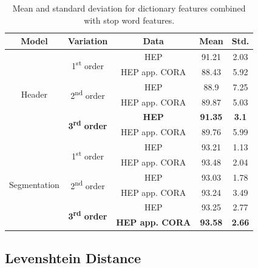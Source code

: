 \begin{table}[h]
\begin{center}
\begin{tabular}{|c|c|c|c|c|}
\hline
Model & Variation & Data & Mean & Std.\\
\hline \multirow{6}{*}{Header} & \multirow{2}{*}{1\textsuperscript{st} order} & HEP & 91.21 & 2.03\\\cline{3-5}
& & HEP app. CORA & 88.43 & 5.92\\\cline{2-5}
& \multirow{2}{*}{2\textsuperscript{nd} order} & HEP & 88.9 & 7.25\\\cline{3-5}
& & HEP app. CORA & 89.87 & 5.03\\\cline{2-5}
& \multirow{2}{*}{\textbf{3\textsuperscript{rd} order}} & \textbf{HEP} & \textbf{91.35} & \textbf{3.1}\\\cline{3-5}
& & HEP app. CORA & 89.76 & 5.99\\ \hline
\multirow{6}{*}{Segmentation} & \multirow{2}{*}{1\textsuperscript{st} order} & HEP & 93.21 & 1.13\\\cline{3-5}
& & HEP app. CORA & 93.48 & 2.04\\\cline{2-5}
& \multirow{2}{*}{2\textsuperscript{nd} order} & HEP & 93.03 & 1.78\\\cline{3-5}
& & HEP app. CORA & 93.24 & 3.49\\\cline{2-5}
& \multirow{2}{*}{\textbf{3\textsuperscript{rd} order}} & HEP & 93.25 & 2.77\\\cline{3-5}
& & \textbf{HEP app. CORA} & \textbf{93.58} & \textbf{2.66}\\
\hline
\end{tabular}
\caption{Mean and standard deviation for dictionary features combined with stop word features.}
\label{table:dictsstopsresults}
\end{center}
\end{table}

\subsection{Levenshtein Distance}

